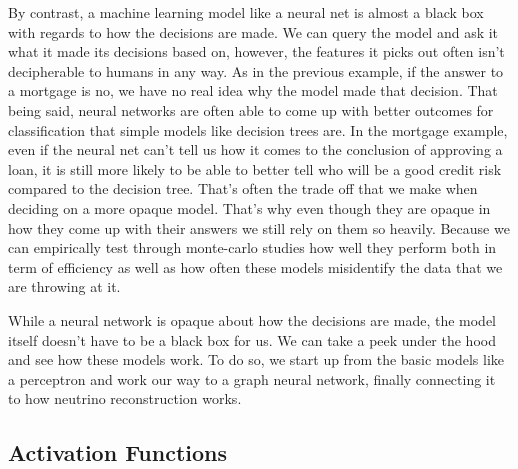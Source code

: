 By contrast, a machine learning model like a neural net is almost a black box with regards to how the decisions are made.
We can query the model and ask it what it made its decisions based on, however, the features it picks out often isn't decipherable to humans in any way.
As in the previous example, if the answer to a mortgage is no, we have no real idea why the model made that decision.
That being said, neural networks are often able to come up with better outcomes for classification that simple models like decision trees are.
In the mortgage example, even if the neural net can't tell us how it comes to the conclusion of approving a loan, it is still more likely to be able to better tell who will be a good credit risk compared to the decision tree.
That's often the trade off that we make when deciding on a more opaque model.
That's why even though they are opaque in how they come up with their answers we still rely on them so heavily.
Because we can empirically test through monte-carlo studies how well they perform both in term of efficiency as well as how often these models misidentify the data that we are throwing at it.

While a neural network is opaque about how the decisions are made, the model itself doesn't have to be a black box for us.
We can take a peek under the hood and see how these models work.
To do so, we start up from the basic models like a perceptron and work our way to a graph neural network, finally connecting it to how neutrino reconstruction works.





\subsection{Activation Functions}






 